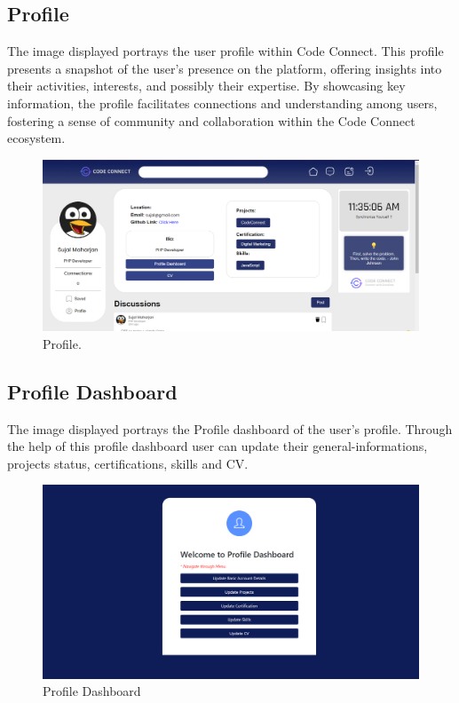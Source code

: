\subsection{Profile}
The image displayed portrays the user profile within Code Connect. This profile presents a snapshot of the user's presence on the platform, offering insights into their activities, interests, and possibly their expertise. By showcasing key information, the profile facilitates connections and understanding among users, fostering a sense of community and collaboration within the Code Connect ecosystem.
\begin{figure}[H]
    \centering
    \includegraphics[width=1\textwidth]{Outcome-ss/self-profile.png}
    \caption{Profile.}
    \label{fig:Profile}
\end{figure}

\subsection{Profile Dashboard}
The image displayed portrays the Profile dashboard of the user's profile. Through the help of this profile dashboard user can update their general-informations, projects status, certifications, skills and CV.   
\begin{figure}[H]
    \centering
    \includegraphics[width=1\textwidth]{Outcome-ss/profile-dashboard.png}
    \caption{Profile Dashboard}
    \label{fig:Profile Dashboard}
\end{figure}

